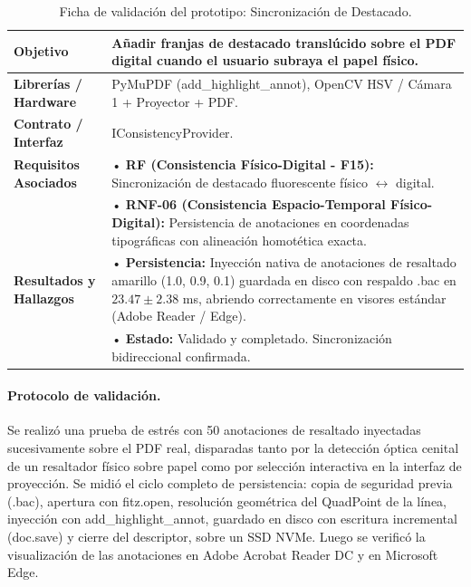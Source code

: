 \begin{table}[H]
    \centering
    \caption{Ficha de validación del prototipo: Sincronización de Destacado.}
    \label{tab:ficha_f15}
    \begin{tabular}{|L{3.2cm}|L{11.0cm}|}
        \hline
        \textbf{Objetivo} & Añadir franjas de destacado translúcido sobre el PDF digital cuando el usuario subraya el papel físico. \\ \hline
        \textbf{Librerías / Hardware} & PyMuPDF (add\_highlight\_annot), OpenCV HSV / Cámara 1 + Proyector + PDF. \\ \hline
        \textbf{Contrato / Interfaz} & IConsistencyProvider. \\ \hline
        \textbf{Requisitos Asociados} &
        • \textbf{RF (Consistencia Físico-Digital - F15):} Sincronización de destacado fluorescente físico $\leftrightarrow$ digital. \vspace{0.1cm} \\
        & • \textbf{RNF-06 (Consistencia Espacio-Temporal Físico-Digital):} Persistencia de anotaciones en coordenadas tipográficas con alineación homotética exacta. \\ \hline
        \textbf{Resultados y Hallazgos} &
        • \textbf{Persistencia:} Inyección nativa de anotaciones de resaltado amarillo (1.0, 0.9, 0.1) guardada en disco con respaldo .bac en $23.47 \pm 2.38$ ms, abriendo correctamente en visores estándar (Adobe Reader / Edge). \vspace{0.1cm} \\
        & • \textbf{Estado:} Validado y completado. Sincronización bidireccional confirmada. \\ \hline
    \end{tabular}
\end{table}
 
\paragraph{Protocolo de validación.} Se realizó una prueba de estrés con 50 anotaciones de resaltado inyectadas sucesivamente sobre el PDF real, disparadas tanto por la detección óptica cenital de un resaltador físico sobre papel como por selección interactiva en la interfaz de proyección. Se midió el ciclo completo de persistencia: copia de seguridad previa (.bac), apertura con fitz.open, resolución geométrica del QuadPoint de la línea, inyección con add\_highlight\_annot, guardado en disco con escritura incremental (doc.save) y cierre del descriptor, sobre un SSD NVMe. Luego se verificó la visualización de las anotaciones en Adobe Acrobat Reader DC y en Microsoft Edge.
 
